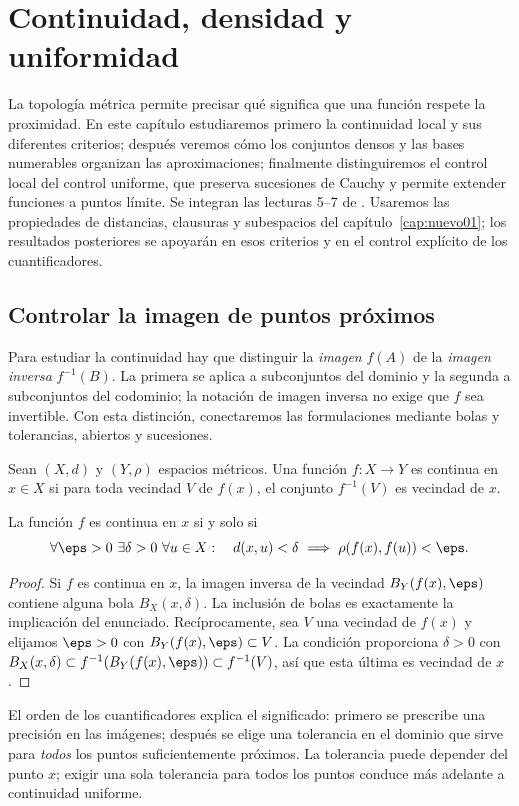 \chapter{Continuidad, densidad y uniformidad}\label{cap:nuevo02}\label{chap:05}\label{chap:06}\label{chap:07}

La topología métrica permite precisar qué significa que una función respete la proximidad. En este capítulo estudiaremos primero la continuidad local y sus diferentes criterios; después veremos cómo los conjuntos densos y las bases numerables organizan las aproximaciones; finalmente distinguiremos el control local del control uniforme, que preserva sucesiones de Cauchy y permite extender funciones a puntos límite. Se integran las lecturas 5--7 de \cite{valencia}. Usaremos las propiedades de distancias, clausuras y subespacios del capítulo~\ref{cap:nuevo01}; los resultados posteriores se apoyarán en esos criterios y en el control explícito de los cuantificadores.

\section{Controlar la imagen de puntos próximos}\label{lectura:05}
Para estudiar la continuidad hay que distinguir la \emph{imagen} $f(A)$ de la \emph{imagen inversa} $f^{-1}(B)$. La primera se aplica a subconjuntos del dominio y la segunda a subconjuntos del codominio; la notación de imagen inversa no exige que $f$ sea invertible. Con esta distinción, conectaremos las formulaciones mediante bolas y tolerancias, abiertos y sucesiones.

\begin{definicion}\label{ch05:continua}
Sean $(X,d)$ y $(Y,\rho)$ espacios métricos. Una función $f:X\to Y$ es continua en $x\in X$ si para toda vecindad $V$ de $f(x)$, el conjunto $f^{-1}(V)$ es vecindad de $x$.
\end{definicion}

\begin{teorema}\label{ch05:epsdelta}
La función $f$ es continua en $x$ si y solo si
\[
\forall\eps>0\ \exists\delta>0\ \forall u\in X:
\quad d(x,u)<\delta\ \Longrightarrow\ \rho(f(x),f(u))<\eps.
\]
\end{teorema}
\begin{proof}
Si $f$ es continua en $x$, la imagen inversa de la vecindad $B_Y(f(x),\eps)$ contiene alguna bola $B_X(x,\delta)$. La inclusión de bolas es exactamente la implicación del enunciado. Recíprocamente, sea $V$ una vecindad de $f(x)$ y elijamos $\eps>0$ con $B_Y(f(x),\eps)\subset V$. La condición proporciona $\delta>0$ con $B_X(x,\delta)\subset f^{-1}(B_Y(f(x),\eps))\subset f^{-1}(V)$, así que esta última es vecindad de $x$.
\end{proof}
El orden de los cuantificadores explica el significado: primero se prescribe una precisión en las imágenes; después se elige una tolerancia en el dominio que sirve para \emph{todos} los puntos suficientemente próximos. La tolerancia puede depender del punto $x$; exigir una sola tolerancia para todos los puntos conduce más adelante a continuidad uniforme.

